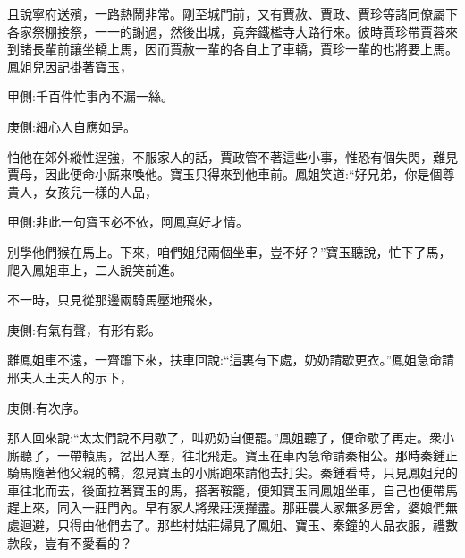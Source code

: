 \begin{parag}
    且說寧府送殯，一路熱鬧非常。剛至城門前，又有賈赦、賈政、賈珍等諸同僚屬下各家祭棚接祭，一一的謝過，然後出城，竟奔鐵檻寺大路行來。彼時賈珍帶賈蓉來到諸長輩前讓坐轎上馬，因而賈赦一輩的各自上了車轎，賈珍一輩的也將要上馬。鳳姐兒因記掛著寶玉，\begin{note}甲側:千百件忙事內不漏一絲。\end{note}\begin{note}庚側:細心人自應如是。\end{note}怕他在郊外縱性逞強，不服家人的話，賈政管不著這些小事，惟恐有個失閃，難見賈母，因此便命小廝來喚他。寶玉只得來到他車前。鳳姐笑道:“好兄弟，你是個尊貴人，女孩兒一樣的人品，\begin{note}甲側:非此一句寶玉必不依，阿鳳真好才情。\end{note}別學他們猴在馬上。下來，咱們姐兒兩個坐車，豈不好？”寶玉聽說，忙下了馬，爬入鳳姐車上，二人說笑前進。
\end{parag}


\begin{parag}
    不一時，只見從那邊兩騎馬壓地飛來，\begin{note}庚側:有氣有聲，有形有影。\end{note}離鳳姐車不遠，一齊躥下來，扶車回說:“這裏有下處，奶奶請歇更衣。”鳳姐急命請邢夫人王夫人的示下，\begin{note}庚側:有次序。\end{note}那人回來說:“太太們說不用歇了，叫奶奶自便罷。”鳳姐聽了，便命歇了再走。衆小廝聽了，一帶轅馬，岔出人羣，往北飛走。寶玉在車內急命請秦相公。那時秦鍾正騎馬隨著他父親的轎，忽見寶玉的小廝跑來請他去打尖。秦鍾看時，只見鳳姐兒的車往北而去，後面拉著寶玉的馬，搭著鞍籠，便知寶玉同鳳姐坐車，自己也便帶馬趕上來，同入一莊門內。早有家人將衆莊漢攆盡。那莊農人家無多房舍，婆娘們無處迴避，只得由他們去了。那些村姑莊婦見了鳳姐、寶玉、秦鐘的人品衣服，禮數款段，豈有不愛看的？
\end{parag}


